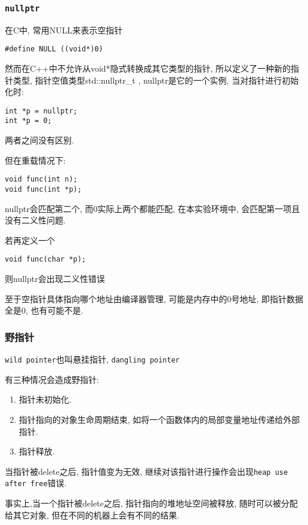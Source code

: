 \subsubsection{\tt{nullptr}}

在C中, 常用NULL来表示空指针
\begin{lstlisting}
#define NULL ((void*)0)
\end{lstlisting}
然而在C++中不允许从void*隐式转换成其它类型的指针, 所以定义了一种新的指针类型, 指针空值类型{\large std::nullptr\_t}
	, {\large nullptr}是它的一个实例, 当对指针进行初始化时:
\begin{lstlisting}
int *p = nullptr;
int *p = 0;
\end{lstlisting}
两者之间没有区别.

\noindent 但在重载情况下:
\begin{lstlisting}
void func(int n);
void func(int *p);
\end{lstlisting}
nullptr会匹配第二个, 而0实际上两个都能匹配, 在本实验环境中, 会匹配第一项且没有二义性问题.

\noindent 若再定义一个
\begin{lstlisting}
void func(char *p);
\end{lstlisting}
则nullptr会出现二义性错误

至于空指针具体指向哪个地址由编译器管理, 可能是内存中的0号地址, 即指针数据全是0, 也有可能不是.


\subsubsection{野指针}

{\tt wild pointer}也叫悬挂指针, {\tt dangling pointer}

有三种情况会造成野指针:
\begin{enumerate}
	\item 指针未初始化.
	\item 指针指向的对象生命周期结束, 如将一个函数体内的局部变量地址传递给外部指针.
	\item 指针释放.
\end{enumerate}

当指针被delete之后, 指针值变为无效, 继续对该指针进行操作会出现{\tt heap use after free}错误.

事实上,当一个指针被delete之后, 指针指向的堆地址空间被释放, 随时可以被分配给其它对象, 但在不同的机器上会有不同的结果.

